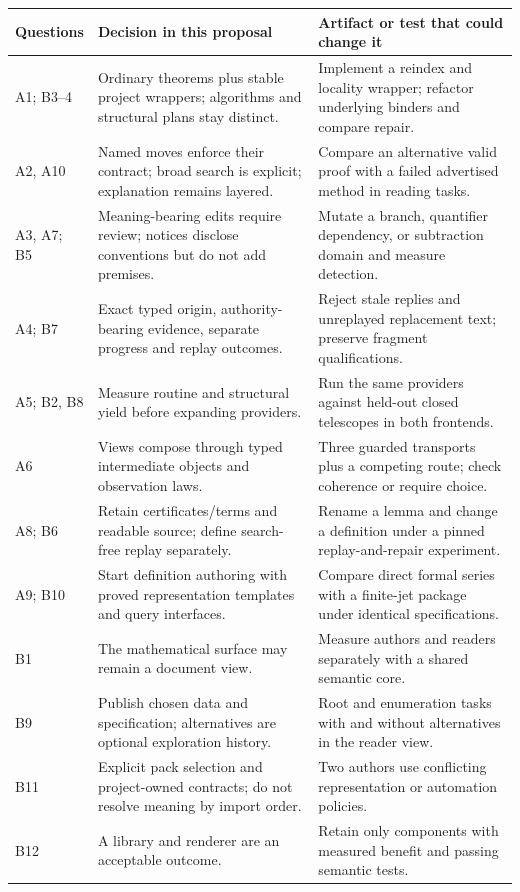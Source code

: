 \documentclass[11pt,a4paper]{article}
\theoremstyle{definition}
\begin{document}
\begin{longtable}{@{}P{.15\textwidth}P{.31\textwidth}P{.46\textwidth}@{}}
\toprule
Questions & Decision in this proposal & Artifact or test that could change it\\
\midrule
\endhead
A1; B3--4 & Ordinary theorems plus stable project wrappers; algorithms and structural plans stay distinct. & Implement a reindex and locality wrapper; refactor underlying binders and compare repair.\\
A2, A10 & Named moves enforce their contract; broad search is explicit; explanation remains layered. & Compare an alternative valid proof with a failed advertised method in reading tasks.\\
A3, A7; B5 & Meaning-bearing edits require review; notices disclose conventions but do not add premises. & Mutate a branch, quantifier dependency, or subtraction domain and measure detection.\\
A4; B7 & Exact typed origin, authority-bearing evidence, separate progress and replay outcomes. & Reject stale replies and unreplayed replacement text; preserve fragment qualifications.\\
A5; B2, B8 & Measure routine and structural yield before expanding providers. & Run the same providers against held-out closed telescopes in both frontends.\\
A6 & Views compose through typed intermediate objects and observation laws. & Three guarded transports plus a competing route; check coherence or require choice.\\
A8; B6 & Retain certificates/terms and readable source; define search-free replay separately. & Rename a lemma and change a definition under a pinned replay-and-repair experiment.\\
A9; B10 & Start definition authoring with proved representation templates and query interfaces. & Compare direct formal series with a finite-jet package under identical specifications.\\
B1 & The mathematical surface may remain a document view. & Measure authors and readers separately with a shared semantic core.\\
B9 & Publish chosen data and specification; alternatives are optional exploration history. & Root and enumeration tasks with and without alternatives in the reader view.\\
B11 & Explicit pack selection and project-owned contracts; do not resolve meaning by import order. & Two authors use conflicting representation or automation policies.\\
B12 & A library and renderer are an acceptable outcome. & Retain only components with measured benefit and passing semantic tests.\\
\bottomrule
\end{longtable}
\end{document}
